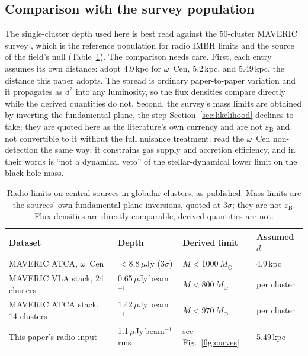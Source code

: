 \documentclass[11pt]{article}
\newcommand{\msun}{\ensuremath{M_\odot}}
\newcommand{\ocen}{$\omega$~Cen}
\newcommand{\eps}{\ensuremath{\varepsilon_{\mathrm{B}}}}
\begin{document}
\subsection{Comparison with the survey population}
\label{sec:maveric}

The single-cluster depth used here is best read against the 50-cluster MAVERIC survey \citep{Tremou2018}, which is the reference population for radio IMBH limits and the source of the field's null (Table~\ref{tab:maveric}). The comparison needs care. First, each entry assumes its own distance: \citet{Tremou2018} adopt 4.9\,kpc for \ocen{}, \citet{Haggard2013} 5.2\,kpc, \citet{Chen2025JWST} and \citet{Mahida2026} 5.49\,kpc, the distance this paper adopts. The spread is ordinary paper-to-paper variation and it propagates as $d^{2}$ into any luminosity, so the flux densities compare directly while the derived quantities do not. Second, the survey's mass limits are obtained by inverting the fundamental plane, the step Section~\ref{sec:likelihood} declines to take; they are quoted here as the literature's own currency and are not $\eps$ and not convertible to it without the full nuisance treatment. \citet{Abbassi2026} read the \ocen{} non-detection the same way: it constrains gas supply and accretion efficiency, and in their words is ``not a dynamical veto'' of the stellar-dynamical lower limit on the black-hole mass.

\begin{table}[htbp]
\centering
\small
\caption{Radio limits on central sources in globular clusters, as published. Mass limits are the sources' own fundamental-plane inversions, quoted at $3\sigma$; they are not $\eps$. Flux densities are directly comparable, derived quantities are not.}
\label{tab:maveric}
\begin{tabular}{llll}
\toprule
Dataset & Depth & Derived limit & Assumed $d$ \\
\midrule
MAVERIC ATCA, \ocen{} \citep{Tremou2018} & $<8.8\,\mu$Jy ($3\sigma$) & $M < 1000\,\msun$ & 4.9\,kpc \\
MAVERIC VLA stack, 24 clusters & 0.65\,$\mu$Jy\,beam$^{-1}$ & $M < 800\,\msun$ & per cluster \\
MAVERIC ATCA stack, 14 clusters & 1.42\,$\mu$Jy\,beam$^{-1}$ & $M < 970\,\msun$ & per cluster \\
This paper's radio input \citep{Mahida2026} & 1.1\,$\mu$Jy\,beam$^{-1}$ rms & see Fig.~\ref{fig:curves} & 5.49\,kpc \\
\bottomrule
\end{tabular}
\end{table}
\end{document}
